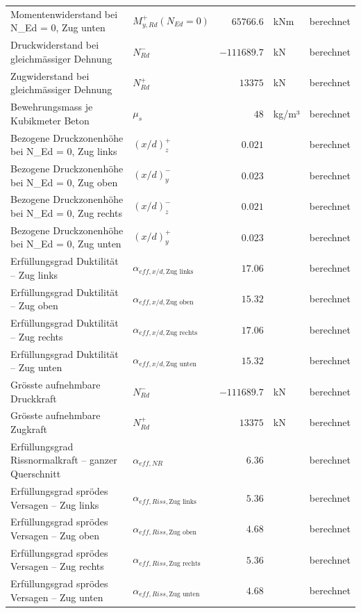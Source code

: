 \documentclass[11pt,a4paper]{article}
\begin{document}
\begin{xltabular}{\linewidth}{>{\raggedright\arraybackslash}Xlrll}
Momentenwiderstand bei N\_Ed = 0, Zug unten & $M_{y,Rd}^{+}(N_{Ed} = 0)$ & $65766.6$ & kNm & berechnet \\
Druckwiderstand bei gleichmässiger Dehnung & $N_{Rd}^{-}$ & $-111689.7$ & kN & berechnet \\
Zugwiderstand bei gleichmässiger Dehnung & $N_{Rd}^{+}$ & $13375$ & kN & berechnet \\
Bewehrungsmass je Kubikmeter Beton & $\mu_s$ & $48$ & kg/m³ & berechnet \\
Bezogene Druckzonenhöhe bei N\_Ed = 0, Zug links & $\left(x/d\right)_{z}^{+}$ & $0.021$ &  & berechnet \\
Bezogene Druckzonenhöhe bei N\_Ed = 0, Zug oben & $\left(x/d\right)_{y}^{-}$ & $0.023$ &  & berechnet \\
Bezogene Druckzonenhöhe bei N\_Ed = 0, Zug rechts & $\left(x/d\right)_{z}^{-}$ & $0.021$ &  & berechnet \\
Bezogene Druckzonenhöhe bei N\_Ed = 0, Zug unten & $\left(x/d\right)_{y}^{+}$ & $0.023$ &  & berechnet \\
Erfüllungsgrad Duktilität – Zug links & $\alpha_{eff,x/d,\text{Zug links}}$ & $17.06$ &  & berechnet \\
Erfüllungsgrad Duktilität – Zug oben & $\alpha_{eff,x/d,\text{Zug oben}}$ & $15.32$ &  & berechnet \\
Erfüllungsgrad Duktilität – Zug rechts & $\alpha_{eff,x/d,\text{Zug rechts}}$ & $17.06$ &  & berechnet \\
Erfüllungsgrad Duktilität – Zug unten & $\alpha_{eff,x/d,\text{Zug unten}}$ & $15.32$ &  & berechnet \\
Grösste aufnehmbare Druckkraft & $N_{Rd}^{-}$ & $-111689.7$ & kN & berechnet \\
Grösste aufnehmbare Zugkraft & $N_{Rd}^{+}$ & $13375$ & kN & berechnet \\
Erfüllungsgrad Rissnormalkraft – ganzer Querschnitt & $\alpha_{eff,NR}$ & $6.36$ &  & berechnet \\
Erfüllungsgrad sprödes Versagen – Zug links & $\alpha_{eff,Riss,\text{Zug links}}$ & $5.36$ &  & berechnet \\
Erfüllungsgrad sprödes Versagen – Zug oben & $\alpha_{eff,Riss,\text{Zug oben}}$ & $4.68$ &  & berechnet \\
Erfüllungsgrad sprödes Versagen – Zug rechts & $\alpha_{eff,Riss,\text{Zug rechts}}$ & $5.36$ &  & berechnet \\
Erfüllungsgrad sprödes Versagen – Zug unten & $\alpha_{eff,Riss,\text{Zug unten}}$ & $4.68$ &  & berechnet \\

\end{xltabular}
\end{document}
